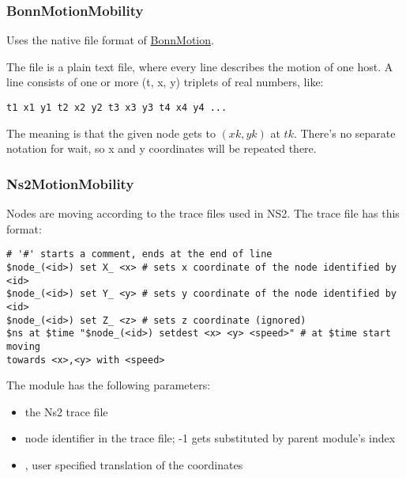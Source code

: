 \subsubsection*{BonnMotionMobility}

Uses the native file format of \href{http://bonnmotion.net}{BonnMotion}.

The file is a plain text file, where every line describes the motion
of one host. A line consists of one or more (t, x, y) triplets of real
numbers, like:

\begin{verbatim}
t1 x1 y1 t2 x2 y2 t3 x3 y3 t4 x4 y4 ...
\end{verbatim}

The meaning is that the given node gets to $(xk,yk)$ at $tk$. There's no
separate notation for wait, so x and y coordinates will be repeated there.

\subsubsection*{Ns2MotionMobility}

Nodes are moving according to the trace files used in NS2.
The trace file has this format:

\begin{verbatim}
# '#' starts a comment, ends at the end of line
$node_(<id>) set X_ <x> # sets x coordinate of the node identified by <id>
$node_(<id>) set Y_ <y> # sets y coordinate of the node identified by <id>
$node_(<id>) set Z_ <z> # sets z coordinate (ignored)
$ns at $time "$node_(<id>) setdest <x> <y> <speed>" # at $time start moving
towards <x>,<y> with <speed>
\end{verbatim}

The  module has the following parameters:

\begin{itemize}
  \item {} the Ns2 trace file
  \item {} node identifier in the trace file; -1 gets substituted by
  parent module's index
  \item {},  user specified translation of the
  coordinates
\end{itemize}


